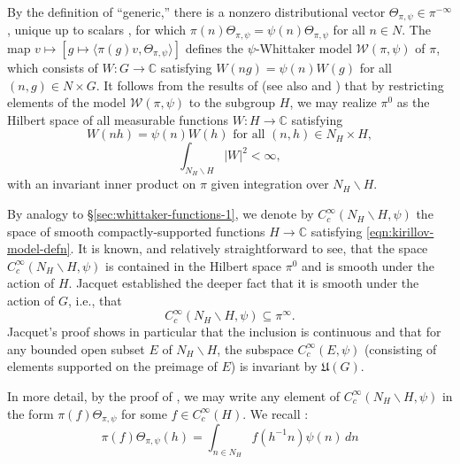 \documentclass[reqno]{amsart}
\theoremstyle{plain} \newtheorem{theorem} {Theorem}
\theoremstyle{definition} \newtheorem{definition} [theorem] {Definition}
\theoremstyle{itplain} %
\numberwithin{equation}{section}
\numberwithin{theorem}{section}
\begin{document}
By the definition of ``generic,'' there is a nonzero distributional vector  $\Theta_{\pi,\psi} \in \pi^{-\infty}$, unique up to scalars \cite{MR348047}, for which $\pi(n) \Theta_{\pi,\psi} = \psi(n) \Theta_{\pi,\psi}$ for all $n \in N$.  The map $v \mapsto [g \mapsto \langle \pi(g) v, \Theta_{\pi,\psi} \rangle]$ defines the $\psi$-Whittaker model $\mathcal{W}(\pi,\psi)$ of $\pi$, which consists of $W : G \rightarrow \mathbb{C}$ satisfying $W(n g) = \psi(n) W(g)$ for all $(n,g) \in N \times G$.  It follows from the results of \cite{MR1999922} (see also \cite{MR748505} and \cite[Ch. III]{MR0579172}) that by restricting elements of the model $\mathcal{W}(\pi,\psi)$ to the subgroup $H$, we may realize $\pi^0$ as the Hilbert space of all measurable functions $W : H \rightarrow \mathbb{C}$ satisfying
\begin{equation}\label{eqn:kirillov-model-defn}
  W(n h) = \psi(n) W(h)
  \text{ for all } (n,h) \in N_H \times H,
\end{equation}
\begin{equation}\label{eq:int_n_h-backslash-h}
  \int_{N_H \backslash H} |W|^2 < \infty,
\end{equation}
with an invariant inner product on $\pi$ given integration over $N_H \backslash H$.

By analogy to \S\ref{sec:whittaker-functions-1}, we denote by $C_c^\infty(N_H \backslash H,\psi)$ the space of smooth compactly-supported functions $H \rightarrow \mathbb{C}$ satisfying \eqref{eqn:kirillov-model-defn}.  It is known, and relatively straightforward to see, that the space $C_c^\infty(N_H \backslash H, \psi)$ is contained in the Hilbert space $\pi^0$ and is smooth under the action of $H$.  Jacquet \cite[Prop 5]{MR2733072} established the deeper fact that it is smooth under the action of $G$, i.e., that
\begin{equation*}
  C_c^\infty(N_H \backslash H, \psi) \subseteq \pi^\infty.
\end{equation*}
Jacquet's proof shows in particular that the inclusion is continuous and that for any bounded open subset $E$ of $N_H \backslash H$, the subspace $C_c^\infty(E, \psi)$ (consisting of elements supported on the preimage of $E$) is invariant by $\mathfrak{U}(G)$.

In more detail, by the proof of \cite[Prop 5]{MR2733072}, we may write any element of $C_c^\infty(N_H \backslash H, \psi)$ in the form $\pi(f) \Theta_{\pi,\psi}$ for some $f \in C_c^\infty(H)$.  We recall \cite[Lem 7]{MR2733072}:
\begin{equation}\label{eq:pif-theta_pi-h}
  \pi(f) \Theta_{\pi,\psi} (h)
  =
  \int_{n \in N_H}
  f(h^{-1} n)
  \psi(n) \, d n
\end{equation}
\end{document}
